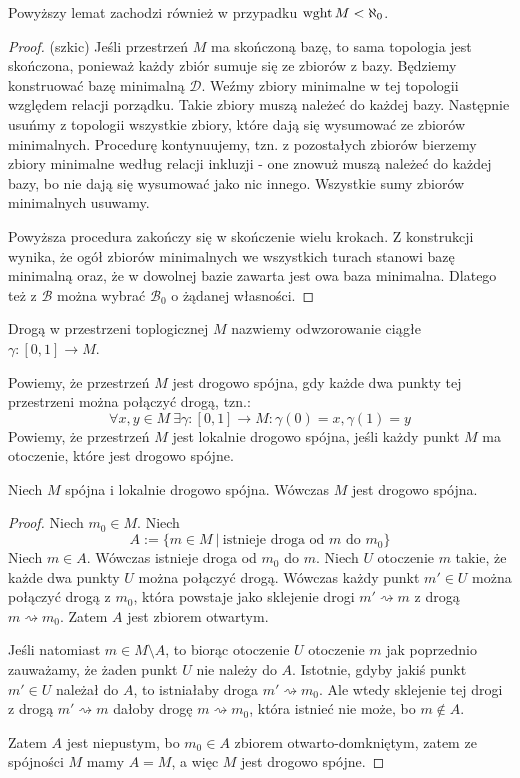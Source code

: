 \begin{fact}
  Powyższy lemat zachodzi również w przypadku $\operatorname{wght} M < \aleph_0$.
  \begin{proof}(szkic)
    Jeśli przestrzeń $M$ ma skończoną bazę, to sama topologia jest skończona, ponieważ każdy zbiór sumuje się ze zbiorów z bazy. Będziemy konstruować bazę minimalną $\mathcal D$. Weźmy zbiory minimalne w tej topologii względem relacji porządku. Takie zbiory muszą należeć do każdej bazy. Następnie usuńmy z topologii wszystkie zbiory, które dają się wysumować ze zbiorów minimalnych. Procedurę kontynuujemy, tzn. z pozostałych zbiorów bierzemy zbiory minimalne według relacji inkluzji - one znowuż muszą należeć do każdej bazy, bo nie dają się wysumować jako nic innego. Wszystkie sumy zbiorów minimalnych usuwamy.
    
    Powyższa procedura zakończy się w skończenie wielu krokach. Z konstrukcji wynika, że ogół zbiorów minimalnych we wszystkich turach stanowi bazę minimalną oraz, że w dowolnej bazie zawarta jest owa baza minimalna. Dlatego też z $\mathcal B$ można wybrać $\mathcal B_0$ o żądanej własności.
  \end{proof}
\end{fact}

\begin{df}
  Drogą w przestrzeni toplogicznej $M$ nazwiemy odwzorowanie ciągłe $\gamma: [0,1] \to M$.
\end{df}
\begin{df}
  Powiemy, że przestrzeń $M$ jest drogowo spójna, gdy każde dwa punkty tej przestrzeni można połączyć drogą, tzn.:
  \[
    \forall x,y \in M\ \exists \gamma: [0,1] \to M: \gamma(0) = x, \gamma(1) = y
  \]
  Powiemy, że przestrzeń $M$ jest lokalnie drogowo spójna, jeśli każdy punkt $M$ ma otoczenie, które jest drogowo spójne.
\end{df}


\begin{lem} \label{lem:local-connectedness}
  Niech $M$ spójna i lokalnie drogowo spójna. Wówczas $M$ jest drogowo spójna.
  \begin{proof}
    Niech $m_0 \in M$. Niech
    \[
      A := \{m \in M\ |\ \mbox{istnieje droga od $m$ do $m_0$}\}
    \]
    Niech $m \in A$.
    Wówczas istnieje droga od $m_0$ do $m$.
    Niech $U$ otoczenie $m$ takie, że każde dwa punkty $U$ można połączyć drogą.
    Wówczas każdy punkt $m' \in U$ można połączyć drogą z $m_0$, która powstaje jako sklejenie drogi $m' \rightsquigarrow m$ z drogą $m \rightsquigarrow m_0$.
    Zatem $A$ jest zbiorem otwartym.
    
    Jeśli natomiast $m \in M \setminus A$, to biorąc otoczenie $U$ otoczenie $m$ jak poprzednio zauważamy, że żaden punkt $U$ nie należy do $A$. Istotnie, gdyby jakiś punkt $m' \in U$ należał do $A$, to istniałaby droga $m' \rightsquigarrow m_0$.
    Ale wtedy sklejenie tej drogi z drogą $m' \rightsquigarrow m$ dałoby drogę $m \rightsquigarrow m_0$, która istnieć nie może, bo $m \not\in A$.
    
    Zatem $A$ jest niepustym, bo $m_0 \in A$ zbiorem otwarto-domkniętym, zatem ze spójności $M$ mamy $A = M$, a więc $M$ jest drogowo spójne.
  \end{proof}
\end{lem}


